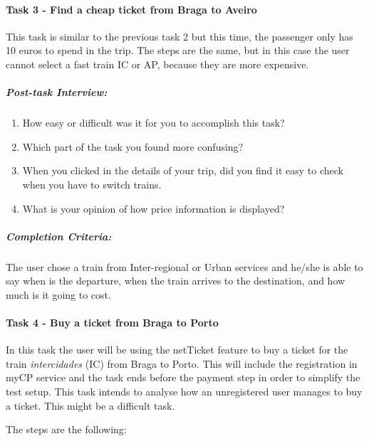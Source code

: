 \documentclass[a4paper]{article}
\begin{document}
\paragraph{Task 3 - Find a cheap ticket from Braga to Aveiro}
This task is similar to the previous task 2 but this time, the passenger only has 10 euros to spend in the trip. The steps are the same, but in this case the user cannot select a fast train IC or AP, because they are more expensive.

\subparagraph{Post-task Interview:}

\begin{enumerate}[label=3.\theenumi .]
  \item How easy or difficult was it for you to accomplish this task?
  \item Which part of the task you found more confusing?
  \item When you clicked in the details of your trip, did you find it easy to check when you have to switch trains.
  \item What is your opinion of how price information is displayed?
\end{enumerate}

\subparagraph{Completion Criteria:} The user chose a train from Inter-regional or Urban services and he/she is able to say when is the departure, when the train arrives to the destination, and how much is it going to cost.


\paragraph{Task 4 - Buy a ticket from Braga to Porto}
In this task the user will be using the netTicket feature to buy a ticket for the train \emph{intercidades} (IC) from Braga to Porto. This will include the registration in myCP service and the task ends before the payment step in order to simplify the test setup. This task intends to analyse how an unregistered user manages to buy a ticket. This might be a difficult task.

The steps are the following:
\end{document}

